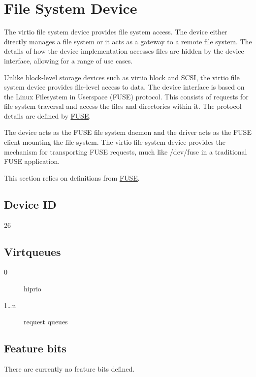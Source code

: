 \section{File System Device}\label{sec:Device Types / File System Device}

The virtio file system device provides file system access.  The device either
directly manages a file system or it acts as a gateway to a remote file system.
The details of how the device implementation accesses files are hidden by the
device interface, allowing for a range of use cases.

Unlike block-level storage devices such as virtio block and SCSI, the virtio
file system device provides file-level access to data.  The device interface is
based on the Linux Filesystem in Userspace (FUSE) protocol.  This consists of
requests for file system traversal and access the files and directories within
it.  The protocol details are defined by \hyperref[intro:FUSE]{FUSE}.

The device acts as the FUSE file system daemon and the driver acts as the FUSE
client mounting the file system.  The virtio file system device provides the
mechanism for transporting FUSE requests, much like /dev/fuse in a traditional
FUSE application.

This section relies on definitions from \hyperref[intro:FUSE]{FUSE}.

\subsection{Device ID}\label{sec:Device Types / File System Device / Device ID}
  26

\subsection{Virtqueues}\label{sec:Device Types / File System Device / Virtqueues}

\begin{description}
\item[0] hiprio
\item[1\ldots n] request queues
\end{description}

\subsection{Feature bits}\label{sec:Device Types / File System Device / Feature bits}

There are currently no feature bits defined.

